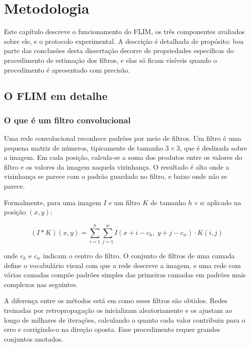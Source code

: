 \chapter{Metodologia}\label{cap_3}

Este capítulo descreve o funcionamento do \ac{FLIM}, os três componentes avaliados sobre ele, e o protocolo experimental. A descrição é detalhada de propósito: boa parte das conclusões desta dissertação decorre de propriedades específicas do procedimento de estimação dos filtros, e elas só ficam visíveis quando o procedimento é apresentado com precisão.

\section{O FLIM em detalhe}

\subsection{O que é um filtro convolucional}

Uma rede convolucional reconhece padrões por meio de filtros. Um filtro é uma pequena matriz de números, tipicamente de tamanho $3 \times 3$, que é deslizada sobre a imagem. Em cada posição, calcula-se a soma dos produtos entre os valores do filtro e os valores da imagem naquela vizinhança. O resultado é alto onde a vizinhança se parece com o padrão guardado no filtro, e baixo onde não se parece.

Formalmente, para uma imagem $I$ e um filtro $K$ de tamanho $h \times w$ aplicado na posição $(x, y)$:

\begin{equation}
(I * K)(x, y) = \sum_{i=1}^{h} \sum_{j=1}^{w} I(x + i - c_h,\; y + j - c_w) \cdot K(i, j)
\label{eq_conv}
\end{equation}

onde $c_h$ e $c_w$ indicam o centro do filtro. O conjunto de filtros de uma camada define o vocabulário visual com que a rede descreve a imagem, e uma rede com várias camadas compõe padrões simples das primeiras camadas em padrões mais complexos nas seguintes.

A diferença entre os métodos está em como esses filtros são obtidos. Redes treinadas por retropropagação os inicializam aleatoriamente e os ajustam ao longo de milhares de iterações, calculando o quanto cada valor contribuiu para o erro e corrigindo-o na direção oposta. Esse procedimento requer grandes conjuntos anotados.

